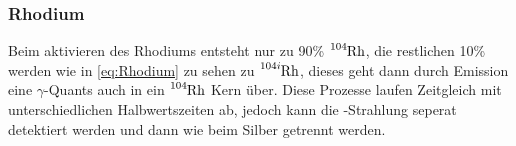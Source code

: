 \subsubsection{Rhodium}

\noindent Beim aktivieren des Rhodiums entsteht nur zu 90\% $\ce{^{104}\text{Rh}}$, die restlichen 10\% werden wie in \ref{eq:Rhodium} zu sehen
zu $\ce{^{104i}\text{Rh}}$, dieses geht dann durch Emission eine $\gamma$-Quants auch in ein $\ce{^{104}\text{Rh}}$ Kern über. Diese Prozesse 
laufen Zeitgleich mit unterschiedlichen Halbwertszeiten ab, jedoch kann die \gamma-Strahlung seperat detektiert werden und dann wie beim Silber 
getrennt werden. 



%
%
